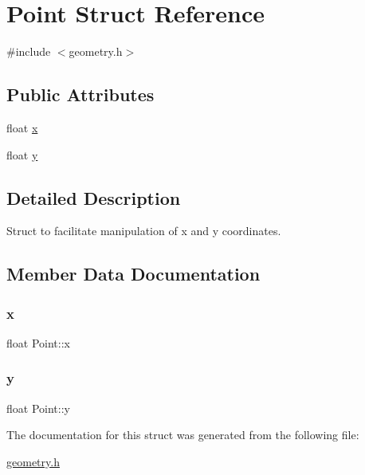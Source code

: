 \hypertarget{structPoint}{}\section{Point Struct Reference}
\label{structPoint}


{\ttfamily \#include $<$geometry.\+h$>$}

\subsection*{Public Attributes}
\begin{DoxyCompactItemize}
\item 
float \hyperlink{structPoint_a05dfe2dfbde813ad234b514f30e662f1}{x}
\item 
float \hyperlink{structPoint_a6101960c8d2d4e8ea1d32c9234bbeb8d}{y}
\end{DoxyCompactItemize}


\subsection{Detailed Description}
Struct to facilitate manipulation of x and y coordinates. 

\subsection{Member Data Documentation}
\mbox{\label{structPoint_a05dfe2dfbde813ad234b514f30e662f1}} 
\subsubsection{\texorpdfstring{x}{x}}
{\footnotesize\ttfamily float Point\+::x}

\mbox{\label{structPoint_a6101960c8d2d4e8ea1d32c9234bbeb8d}} 
\subsubsection{\texorpdfstring{y}{y}}
{\footnotesize\ttfamily float Point\+::y}



The documentation for this struct was generated from the following file\+:\begin{DoxyCompactItemize}
\item 
\hyperlink{geometry_8h}{geometry.\+h}\end{DoxyCompactItemize}

